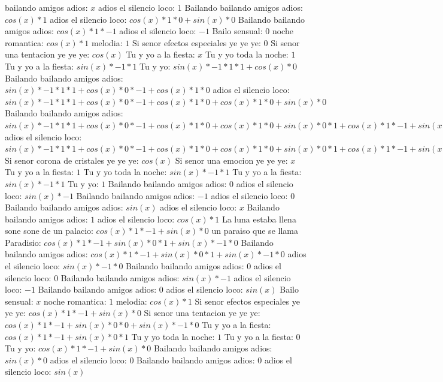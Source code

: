 \documentclass{article}
\begin{document}
bailando amigos adios: $x$ adios el silencio loco: $1$  \newline Bailando bailando amigos adios: $cos(x)*1$ adios el silencio loco: $cos(x)*1*0+sin(x)*0$ Bailando bailando amigos adios: $cos(x)*1*-1$ adios el silencio loco: $-1$ Bailo sensual: $0$  \newline noche romantica: $cos(x)*1$ melodia: $1$ Si senor efectos especiales ye ye ye: $0$  \newline Si senor una tentacion ye ye ye: $cos(x)$  \newline Tu y yo a la fiesta: $x$ Tu y yo toda la noche: $1$  \newline Tu y yo a la fiesta: $sin(x)*-1*1$ Tu y yo: $sin(x)*-1*1*1+cos(x)*0$ Bailando bailando amigos adios: ${sin(x)*-1*1*1+cos(x)*0}*-1+cos(x)*1*0$ adios el silencio loco: ${sin(x)*-1*1*1+cos(x)*0}*-1+cos(x)*1*0+cos(x)*1*0+sin(x)*0$ Bailando bailando amigos adios: ${{sin(x)*-1*1*1+cos(x)*0}*-1+cos(x)*1*0+cos(x)*1*0+sin(x)*0}*1+{cos(x)*1*-1+sin(x)*0}*0$ adios el silencio loco: ${{sin(x)*-1*1*1+cos(x)*0}*-1+cos(x)*1*0+cos(x)*1*0+sin(x)*0}*1+{cos(x)*1*-1+sin(x)*0}*0+{cos(x)*1*-1+sin(x)*0}*0+sin(x)*-1*0$ Si senor corona de cristales ye ye ye: $cos(x)$  \newline Si senor una emocion ye ye ye: $x$ Tu y yo a la fiesta: $1$  \newline Tu y yo toda la noche: $sin(x)*-1*1$ Tu y yo a la fiesta: $sin(x)*-1*1$ Tu y yo: $1$ Bailando bailando amigos adios: $0$  \newline adios el silencio loco: $sin(x)*-1$ Bailando bailando amigos adios: $-1$ adios el silencio loco: $0$  \newline Bailando bailando amigos adios: $sin(x)$  \newline adios el silencio loco: $x$ Bailando bailando amigos adios: $1$  \newline adios el silencio loco: $cos(x)*1$ La luna estaba llena sone sone de un palacio: $cos(x)*1*-1+sin(x)*0$ un paraiso que se llama Paradisio: ${cos(x)*1*-1+sin(x)*0}*1+sin(x)*-1*0$ Bailando bailando amigos adios: ${cos(x)*1*-1+sin(x)*0}*1+sin(x)*-1*0$  \newline adios el silencio loco: $sin(x)*-1*0$ Bailando bailando amigos adios: $0$ adios el silencio loco: $0$  \newline Bailando bailando amigos adios: $sin(x)*-1$ adios el silencio loco: $-1$ Bailando bailando amigos adios: $0$  \newline adios el silencio loco: $sin(x)$  \newline Bailo sensual: $x$ noche romantica: $1$  \newline melodia: $cos(x)*1$ Si senor efectos especiales ye ye ye: $cos(x)*1*-1+sin(x)*0$ Si senor una tentacion ye ye ye: ${cos(x)*1*-1+sin(x)*0}*0+sin(x)*-1*0$ Tu y yo a la fiesta: ${cos(x)*1*-1+sin(x)*0}*1$ Tu y yo toda la noche: $1$ Tu y yo a la fiesta: $0$  \newline Tu y yo: $cos(x)*1*-1+sin(x)*0$  \newline Bailando bailando amigos adios: $sin(x)*0$ adios el silencio loco: $0$ Bailando bailando amigos adios: $0$  \newline adios el silencio loco: $sin(x)$  
\end{document}
